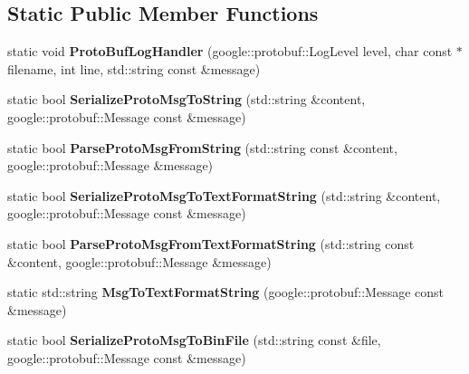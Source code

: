 \subsection*{Static Public Member Functions}
\begin{DoxyCompactItemize}
\item 
\hypertarget{classlsf_1_1util_1_1Protobuf_ad786f00759f15cab47fd9d44ddf8478b}{
static void {\bfseries ProtoBufLogHandler} (google::protobuf::LogLevel level, char const $\ast$filename, int line, std::string const \&message)}
\label{classlsf_1_1util_1_1Protobuf_ad786f00759f15cab47fd9d44ddf8478b}

\item 
\hypertarget{classlsf_1_1util_1_1Protobuf_aa24054dfde3d7cabb26ecceab1c8392e}{
static bool {\bfseries SerializeProtoMsgToString} (std::string \&content, google::protobuf::Message const \&message)}
\label{classlsf_1_1util_1_1Protobuf_aa24054dfde3d7cabb26ecceab1c8392e}

\item 
\hypertarget{classlsf_1_1util_1_1Protobuf_a80c042c02febdeb208be42c2b437e9de}{
static bool {\bfseries ParseProtoMsgFromString} (std::string const \&content, google::protobuf::Message \&message)}
\label{classlsf_1_1util_1_1Protobuf_a80c042c02febdeb208be42c2b437e9de}

\item 
\hypertarget{classlsf_1_1util_1_1Protobuf_a9e8f08c3a442422ad27e71dcdc9ea62f}{
static bool {\bfseries SerializeProtoMsgToTextFormatString} (std::string \&content, google::protobuf::Message const \&message)}
\label{classlsf_1_1util_1_1Protobuf_a9e8f08c3a442422ad27e71dcdc9ea62f}

\item 
\hypertarget{classlsf_1_1util_1_1Protobuf_a0ee3aa7cb3a2f2dc470f05fd70088965}{
static bool {\bfseries ParseProtoMsgFromTextFormatString} (std::string const \&content, google::protobuf::Message \&message)}
\label{classlsf_1_1util_1_1Protobuf_a0ee3aa7cb3a2f2dc470f05fd70088965}

\item 
\hypertarget{classlsf_1_1util_1_1Protobuf_a474125bdf4607ebcb59dd831eabe1aa8}{
static std::string {\bfseries MsgToTextFormatString} (google::protobuf::Message const \&message)}
\label{classlsf_1_1util_1_1Protobuf_a474125bdf4607ebcb59dd831eabe1aa8}

\item 
\hypertarget{classlsf_1_1util_1_1Protobuf_a2b51efd8a7ceaae4a545762aee5f3312}{
static bool {\bfseries SerializeProtoMsgToBinFile} (std::string const \&file, google::protobuf::Message const \&message)}
\label{classlsf_1_1util_1_1Protobuf_a2b51efd8a7ceaae4a545762aee5f3312}


\end{DoxyCompactItemize}
